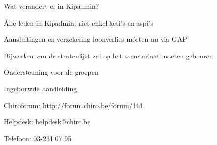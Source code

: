 \documentclass[chiro,pdf]{prosper}
\begin{document}
{
\begin{slide}{Wat verandert er in Kipadmin?}

\begin{itemize}
 {\item \'Alle leden in Kipadmin; niet enkel keti's en aspi's}
 {\item Aansluitingen en verzekering loonverlies m\'oeten nu via GAP}
 {\item Bijwerken van de stratenlijst zal op het secretariaat moeten gebeuren}
\end{itemize}

\end{slide}
}

%
%

{
\begin{slide}{Ondersteuning voor de groepen}

\begin{itemstep}
\item Ingebouwde handleiding
\item Chiroforum: \url{http://forum.chiro.be/forum/144}
\item Helpdesk: {helpdesk@chiro.be}
\item Telefoon: 03-231 07 95
\end{itemstep}

\end{slide}
}


%
%
\end{document}
